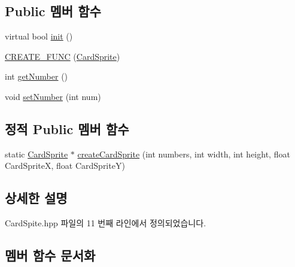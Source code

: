 \subsection*{Public 멤버 함수}
\begin{DoxyCompactItemize}
\item 
virtual bool \hyperlink{classallenlsy_1_1game2048_1_1_card_sprite_ad6769d950c3b9b87092bd7e40d61dd4d}{init} ()
\item 
\hyperlink{classallenlsy_1_1game2048_1_1_card_sprite_acb47a7c82b77019fab80d7d167495c57}{C\+R\+E\+A\+T\+E\+\_\+\+F\+U\+NC} (\hyperlink{classallenlsy_1_1game2048_1_1_card_sprite}{Card\+Sprite})
\item 
int \hyperlink{classallenlsy_1_1game2048_1_1_card_sprite_ac483e81f56c1c7d08a83175061c8edb5}{get\+Number} ()
\item 
void \hyperlink{classallenlsy_1_1game2048_1_1_card_sprite_a7f560bb8253477188273aac709aae087}{set\+Number} (int num)
\end{DoxyCompactItemize}
\subsection*{정적 Public 멤버 함수}
\begin{DoxyCompactItemize}
\item 
static \hyperlink{classallenlsy_1_1game2048_1_1_card_sprite}{Card\+Sprite} $\ast$ \hyperlink{classallenlsy_1_1game2048_1_1_card_sprite_a3a14745470040dfb933397ccb83344d7}{create\+Card\+Sprite} (int numbers, int width, int height, float Card\+SpriteX, float Card\+SpriteY)
\end{DoxyCompactItemize}


\subsection{상세한 설명}


Card\+Spite.\+hpp 파일의 11 번째 라인에서 정의되었습니다.



\subsection{멤버 함수 문서화}
\mbox{\label{classallenlsy_1_1game2048_1_1_card_sprite_acb47a7c82b77019fab80d7d167495c57}} 
